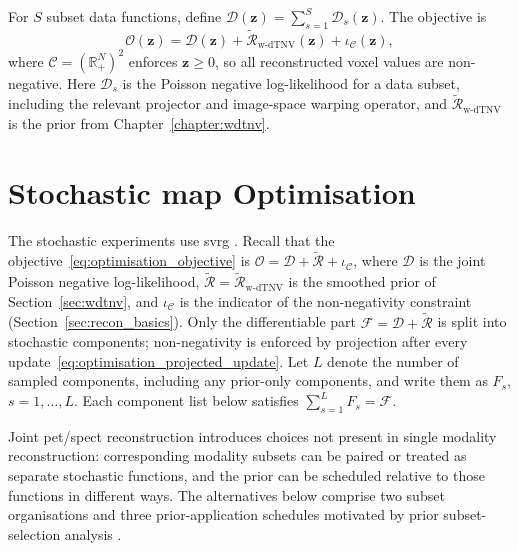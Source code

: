 For $S$ subset data functions, define $\mathcal D(\bm z)=\sum_{s=1}^{S}\mathcal D_s(\bm z)$. The objective is
\begin{equation}
    \mathcal{O}(\bm z)
    =
    \mathcal D(\bm z)
    +
    \widetilde{\mathcal{R}}_{\mathrm{w\text{-}dTNV}}(\bm z)
    +
    \iota_{\mathcal C}(\bm z),
    \label{eq:optimisation_objective}
\end{equation}
where $\mathcal C=(\mathbb R_+^N)^2$ enforces $\bm z\geq0$, so all reconstructed voxel values are non-negative. Here $\mathcal{D}_s$ is the Poisson negative log-likelihood for a data subset, including the relevant projector and image-space warping operator, and $\widetilde{\mathcal{R}}_{\mathrm{w\text{-}dTNV}}$ is the prior from Chapter~\ref{chapter:wdtnv}.

\section{Stochastic \gls{map} Optimisation}
\label{sec:optimisation_svrg}

The stochastic experiments use \gls{svrg} \cite{johnsonAcceleratingStochasticGradient2013,twyman_investigation_2023,ehrhardtFastPETReconstruction2025a}. Recall that the objective~\eqref{eq:optimisation_objective} is $\mathcal O=\mathcal D+\widetilde{\mathcal R}+\iota_{\mathcal C}$, where $\mathcal D$ is the joint Poisson negative log-likelihood, $\widetilde{\mathcal R}=\widetilde{\mathcal{R}}_{\mathrm{w\text{-}dTNV}}$ is the smoothed \wdtnv prior of Section~\ref{sec:wdtnv}, and $\iota_{\mathcal C}$ is the indicator of the non-negativity constraint (Section~\ref{sec:recon_basics}). Only the differentiable part $\mathcal{F}=\mathcal D+\widetilde{\mathcal R}$ is split into stochastic components; non-negativity is enforced by projection after every update~\eqref{eq:optimisation_projected_update}. Let $L$ denote the number of sampled components, including any prior-only components, and write them as $F_s$, $s=1,\ldots,L$. Each component list below satisfies $\sum_{s=1}^L F_s=\mathcal F$.

Joint \gls{pet}/\gls{spect} reconstruction introduces choices not present in single modality reconstruction: corresponding modality subsets can be paired or treated as separate stochastic functions, and the prior can be scheduled relative to those functions in different ways. The alternatives below comprise two subset organisations and three prior-application schedules motivated by prior subset-selection analysis \cite{porterOptimisingSubsetSelection2024a}.

